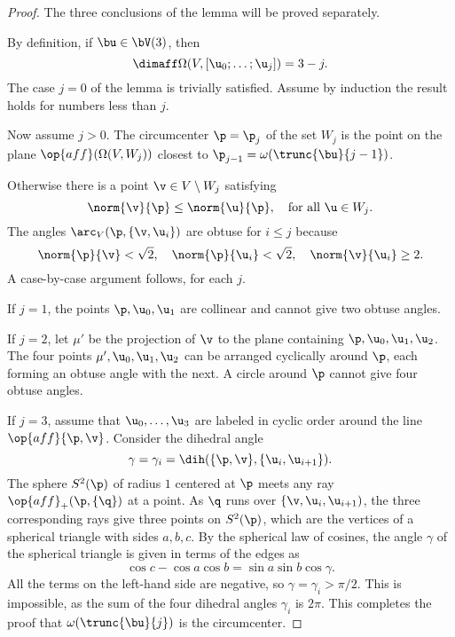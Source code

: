 \begin{proof} The three conclusions of the lemma will be proved
separately.

%
 By definition, if $\bu\in \bV(3)$, then
\begin{displaymath}
\dimaff\Omega(V,[\u_0;\ldots;\u_j]) = 3-j.
\end{displaymath}  
The case $j=0$ of the lemma is trivially
satisfied.  Assume by induction the result holds for numbers less than
$j$.

Now assume $j>0$.  The circumcenter $\p=\p_{j}$ of the set $W_{j}$ is
the point on the plane $\op{aff}(\Omega(V,W_{j}))$ closest to
$\p_{j-1}=\omega(\trunc{\bu}{j-1})$.

   Otherwise
there is a point $\v\in V\setminus W_j$ satisfying
\begin{equation}\label{eqn:closest}
\norm{\v}{\p}\le \norm{ \u}{\p}, \quad\text{for all }  \u\in W_j.
\end{equation}
The angles $\arc_V(\p,\{\v, \u_i\})$ are obtuse for $i\le j$ because
\begin{displaymath}
\norm{\p}{\v} < \sqrt2,\quad \norm{\p}{ \u_i} <\sqrt2,\quad \norm{\v}{ \u_i} \ge 2.
\end{displaymath} 
A case-by-case argument follows, for each $j$.

If $j=1$, the points $\p, \u_0, \u_1$ are collinear and cannot give
two obtuse angles.

If $j=2$, let $\mu'$ be the projection of $\v$ to the plane containing
$\p, \u_0, \u_1, \u_2$. The four points $\mu', \u_0, \u_1, \u_2$ can
be arranged cyclically around $\p$, each forming an obtuse angle with
the next.  A circle around $\p$ cannot give four obtuse angles.


If $j=3$, assume that $ \u_0,\ldots, \u_3$ are labeled in cyclic order
around the line $\op{aff}\{\p,\v\}$.  Consider the dihedral angle
\begin{displaymath}
\gamma=\gamma_i=\dih(\{\p,\v\},\{ \u_i, \u_{i+1}\}).
\end{displaymath}
The sphere $S^2(\p)$ of radius $1$ centered at $\p$ meets any ray
$\op{aff}_+(\p,\{\q\})$ at a point.  As $\q$ runs over $\{\v, \u_i,
\u_{i+1})$, the three corresponding rays give three points on
$S^2(\p)$, which are the vertices of a spherical triangle with sides
$a,b,c$.  By the spherical law of cosines, the angle $\gamma$ of the
spherical triangle is given in terms of the edges as
\begin{displaymath}
\cos c - \cos a \cos b = \sin a \sin b \cos \gamma.
\end{displaymath}
All the terms on the left-hand side are negative, so $\gamma =\gamma_i
> \pi/2$.  This is impossible, as the sum of the four dihedral angles
$\gamma_i$ is $2\pi$.  This completes the proof that $\omega(\trunc{\bu}{j})$
is the circumcenter.


\end{proof}
